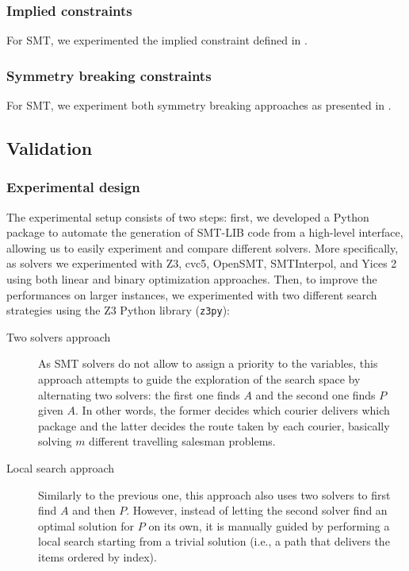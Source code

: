 \subsubsection{Implied constraints}
For SMT, we experimented the implied constraint defined in .


\subsubsection{Symmetry breaking constraints}
For SMT, we experiment both symmetry breaking approaches as presented in .



\subsection{Validation}


\subsubsection{Experimental design}

The experimental setup consists of two steps: first, we developed a Python package to automate the generation of SMT-LIB code from a high-level interface, allowing us to easily experiment and compare different solvers. More specifically, as solvers we experimented with Z3, cvc5, OpenSMT, SMTInterpol, and Yices 2 using both linear and binary optimization approaches. Then, to improve the performances on larger instances, we experimented with two different search strategies using the Z3 Python library (\texttt{z3py}):
\begin{description}
    \item[Two solvers approach]
        As SMT solvers do not allow to assign a priority to the variables, this approach attempts to guide the exploration of the search space by alternating two solvers: the first one finds $A$ and the second one finds $P$ given $A$. In other words, the former decides which courier delivers which package and the latter decides the route taken by each courier, basically solving $m$ different travelling salesman problems. 

    \item[Local search approach]
        Similarly to the previous one, this approach also uses two solvers to first find $A$ and then $P$. However, instead of letting the second solver find an optimal solution for $P$ on its own, it is manually guided by performing a local search starting from a trivial solution (i.e., a path that delivers the items ordered by index).
\end{description}


